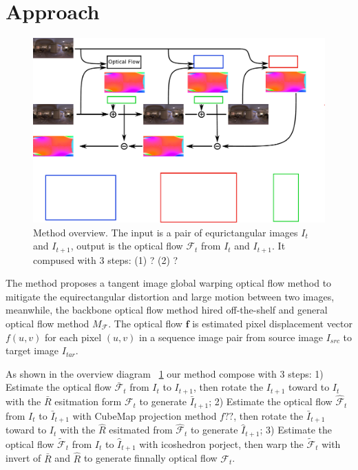 \section{Approach}\label{sec:approach}

\begin{figure}[hbt!]
	\centering
	\includegraphics[width=0.95\linewidth]{images/method_pipeline_1.pdf}
	\caption{Method overview. The input is a pair of equrictangular images $I_t$ and $I_{t+1}$, output is the optical flow $\mathcal{F}_t$ from  $I_t$ and $I_{t+1}$. It compused with 3 steps: (1) ? (2) ?}
	\label{fig:approach:pipeline}
\end{figure}

The method proposes a tangent image global warping optical flow method to mitigate the equirectangular distortion and large motion between two images, meanwhile, the backbone optical flow method hired off-the-shelf and general optical flow method $M_{\mathcal{F}}$.
The optical flow $\textbf{f}$ is estimated pixel displacement vector $f(u,v)$ for each pixel $(u,v)$ in a sequence image pair from source image $I_{src}$ to target image $I_{tar}$.

As shown in the overview diagram ~\cref{fig:approach:pipeline} our method compose with 3 steps:
1) Estimate the optical flow $\bar{\mathcal{F}}_t$ from $I_{t}$ to ${I_{t+1}}$, then rotate the $I_{t+1}$ toward to $I_{t}$ with the $\bar{R}$ esitmation form $\mathcal{F}_t$ to generate ${\bar{I}}_{t+1}$;
2) Estimate the optical flow ${\hat{\mathcal{F}}}_t$ from $I_{t}$ to ${\bar{I}}_{t+1}$ with CubeMap projection method $f??$, then rotate the  ${\bar{I}}_{t+1}$ toward to $I_t$ with the $\hat{R}$ esitmated from ${\hat{\mathcal{F}}}_t$ to generate ${\hat{I}}_{t+1}$;
3) Estimate the optical flow $\tilde{\mathcal{F}}_t$ from $I_{t}$ to ${\hat{I}}_{t+1}$ with icoshedron porject, then warp  the $\tilde{\mathcal{F}}_t$ with invert of $\bar{R}$ and $\hat{R}$ to generate finnally optical flow $\mathcal{F}_t$.

